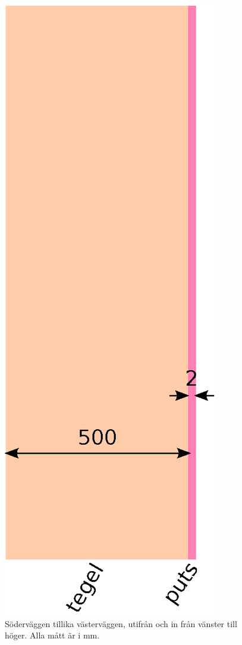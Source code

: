 \begin{figure}[hpbt]
\centering
\includegraphics[height=0.3\textheight]{images/sodervagg.eps}
\caption{\label{fig:sodervagg}{Söderväggen tillika västerväggen, utifrån och in från vänster till höger. Alla mått är i mm.}}
\end{figure}

